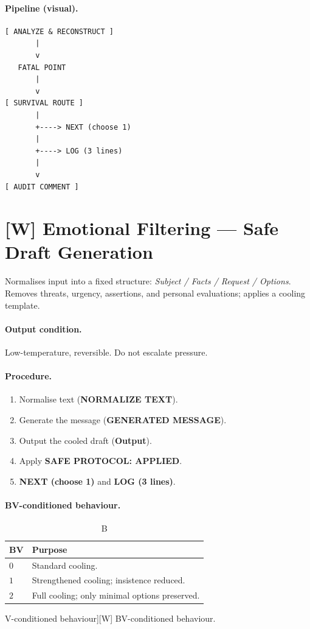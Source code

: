 \paragraph{Pipeline (visual).}

\begin{lstlisting}[basicstyle=\ttfamily\small,frame=single]
[ ANALYZE & RECONSTRUCT ]
       |
       v
   FATAL POINT
       |
       v
[ SURVIVAL ROUTE ]
       |
       +----> NEXT (choose 1)
       |
       +----> LOG (3 lines)
       |
       v
[ AUDIT COMMENT ]
\end{lstlisting}

\section{[W] Emotional Filtering --- Safe Draft Generation}
\label{sec:secretary-W}

Normalises input into a fixed structure: \textit{Subject / Facts /
Request / Options}. Removes threats, urgency, assertions, and
personal evaluations; applies a cooling template.

\paragraph{Output condition.}
Low-temperature, reversible. Do not escalate pressure.

\paragraph{Procedure.}

\begin{enumerate}
\item Normalise text (\textbf{NORMALIZE TEXT}).
\item Generate the message (\textbf{GENERATED MESSAGE}).
\item Output the cooled draft (\textbf{Output}).
\item Apply \textbf{SAFE PROTOCOL: APPLIED}.
\item \textbf{NEXT (choose 1)} and \textbf{LOG (3 lines)}.
\end{enumerate}

\paragraph{BV-conditioned behaviour.}

\begin{table}[ht]
\centering
\small
\begin{tabularx}{0.85\linewidth}{lX}
\toprule
\textbf{BV} & \textbf{Purpose} \\
\midrule
$0$ & Standard cooling. \\
$1$ & Strengthened cooling; insistence reduced. \\
$2$ & Full cooling; only minimal options preserved. \\
\bottomrule
\end{tabularx}
\caption[\,[W] BV-conditioned behaviour]{[W] BV-conditioned
behaviour.}
\label{tab:W-bv}
\end{table}


